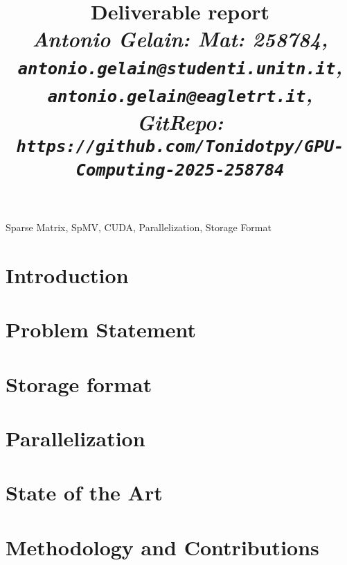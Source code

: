 \documentclass[conference]{IEEEtran}
\begin{document}
    \title{Deliverable report \\
    \footnotesize \textit{Antonio Gelain: Mat: 258784, \\
    \texttt{antonio.gelain@studenti.unitn.it}, \\
    \texttt{antonio.gelain@eagletrt.it}, \\
    GitRepo: \texttt{https://github.com/Tonidotpy/GPU-Computing-2025-258784}}}

    \maketitle

    \begin{abstract}


    \end{abstract}

    \begin{IEEEkeywords}
        Sparse Matrix, SpMV, CUDA, Parallelization, Storage Format
    \end{IEEEkeywords}

    \section{Introduction} 
     
    \section{Problem Statement}

    \section{Storage format}

    \section{Parallelization}

    \section{State of the Art}

    \section{Methodology and Contributions}\label{sec:methodology}
\end{document}
